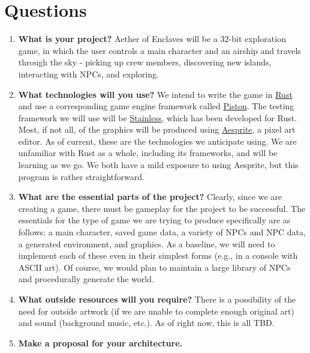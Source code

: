 \documentclass[a4paper]{scrreprt}
\begin{document}
 \section{Questions}
 \begin{enumerate}
   \item \textbf {What is your project?}
   \newline Aether of Enclaves will be a 32-bit exploration game, in which the user controls a main character and an airship and travels through the sky - picking up crew members, discovering new islands, interacting with NPCs, and exploring.
   \item \textbf{What technologies will you use?}
   \newline We intend to write the game in \href{https://www.rust-lang.org/en-US/}{Rust} and use a corresponding game engine framework called \href{https://github.com/PistonDevelopers/piston}{Piston}. The testing framework we will use will be \href{https://github.com/reem/stainless}{Stainless}, which has been developed for Rust. Most, if not all, of the graphics will be produced using \href{https://www.aseprite.org/}{Aesprite}, a pixel art editor.
   \newline
   \newline As of current, these are the technologies we anticipate using. We are unfamiliar with Rust as a whole, including its frameworks, and will be learning as we go. We both have a mild exposure to using Aesprite, but this program is rather straightforward.
   \item \textbf {What are the essential parts of the project?}
   \newline Clearly, since we are creating a game, there must be gameplay for the project to be successful. The essentials for the type of game we are trying to produce specifically are as follows: a main character, saved game data, a variety of NPCs and NPC data, a generated environment, and graphics. As a baseline, we will need to implement each of these even in their simplest forms (e.g., in a console with ASCII art). Of course, we would plan to maintain a large library of NPCs and procedurally generate the world.
   \item \textbf {What outside resources will you require?}
   \newline There is a possibility of the need for outside artwork (if we are unable to complete enough original art) and sound (background music, etc.). As of right now, this is all TBD.
   \item \textbf {Make a proposal for your architecture.}

\end{enumerate}
\end{document}
